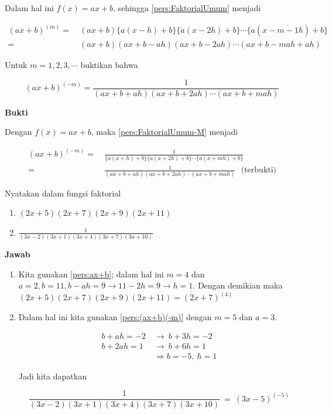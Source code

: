Dalam hal ini $f(x)=ax+b$, sehingga \ref{pers:FaktorialUmum} menjadi

\begin{equation*}
\begin{split}
(ax+b)^{(m)} =~& (ax+b)\{a(x-h)+b\}\{a(x-2h)+b\}\cdots \{a(x-\overline{m-1}h)+b\}\\
 =~&(ax+b)(ax+b-ah)(ax+b-2ah)\cdots (ax+b-mah+ah)
\end{split}
\end{equation*}

\begin{exmp}\end{exmp}
Untuk $m=1,2,3,\cdots$ buktikan bahwa

\begin{equation}\label{pers:(ax+b)(-m)}
\boxed{
(ax+b)^{(-m)} = \frac{1}{(ax+b+ah)(ax+b+2ah)\cdots (ax+b+mah)}
}
\end{equation}

\textbf{Bukti}

Dengan $f(x)=ax+b$, maka \ref{pers:FaktorialUmum-M} menjadi

\begin{equation*}
\begin{split}
(ax+b)^{(-m)} =~& \frac{1}{\{a(x+h)+b\}\{a(x+2h)+b\}\cdots \{a(x+mh)+b\}}\\
=~& \frac{1}{(ax+b+ah)(ax+b+2ah)\cdots (ax+b+mah)}~~~\text{(terbukti)}
\end{split}
\end{equation*}

\begin{exmp}\end{exmp}
Nyatakan dalam fungsi faktorial
\begin{enumerate}
\item $(2x+5)(2x+7)(2x+9)(2x+11)$
\item $\frac{1}{(3x-2)(3x+1)(3x+4)(3x+7)(3x+10)}$
\end{enumerate}

\textbf{Jawab}
\begin{enumerate}
\item Kita gunakan \ref{pers:ax+b}; dalam hal ini $m=4$ dan $a=2, b=11, b-ah=9 \rightarrow 11-2h=9 \rightarrow h=1$. Dengan demikian maka $(2x+5)(2x+7)(2x+9)(2x+11) = (2x+7)^{(4)}$
\item Dalam hal ini kita gunakan \ref{pers:(ax+b)(-m)} dengan $m=5$ dan $a=3$.

\begin{equation*}
\begin{split}
b + ah = -2 ~&\rightarrow~ b + 3h = -2\\
b + 2ah = 1 ~&\rightarrow~ b + 6h = 1\\
&\Longrightarrow b = -5,~h=1
\end{split}
\end{equation*}

Jadi kita dapatkan

\begin{equation*}
\frac{1}{(3x-2)(3x+1)(3x+4)(3x+7)(3x+10)} ~=~ (3x-5)^{(-5)}
\end{equation*}
\end{enumerate}


